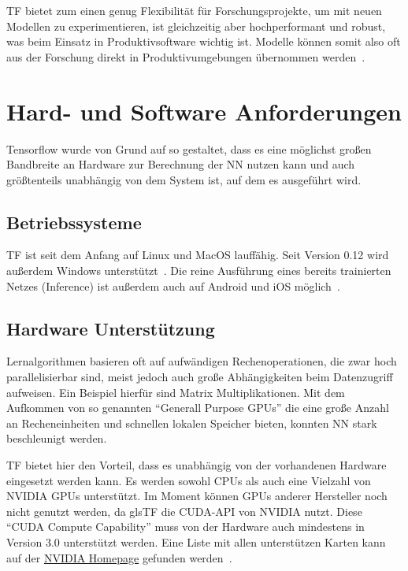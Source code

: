 \gls{TF} bietet zum einen genug Flexibilität für Forschungsprojekte, um mit neuen Modellen zu experimentieren, ist gleichzeitig aber hochperformant und robust, was beim Einsatz in Produktivsoftware wichtig ist. Modelle können somit also oft aus der Forschung direkt in Produktivumgebungen übernommen werden~\cite{tensorflow2016-whitepaper}.


\section{Hard- und Software Anforderungen}
Tensorflow wurde von Grund auf so gestaltet, dass es eine möglichst großen Bandbreite an Hardware zur Berechnung der \gls{NN} nutzen kann und auch größtenteils unabhängig von dem System ist, auf dem es ausgeführt wird.

\subsection{Betriebssysteme}
\gls{TF} ist seit dem Anfang auf Linux und MacOS lauffähig. Seit Version 0.12 wird außerdem Windows unterstützt~\cite{tf0.12}. Die reine Ausführung eines bereits trainierten Netzes (Inference) ist außerdem auch auf Android und iOS möglich~\cite{tensorflow2015-whitepaper}\cite{tensorflow2016-whitepaper}.

\subsection{Hardware Unterstützung}
Lernalgorithmen basieren oft auf aufwändigen Rechenoperationen, die zwar hoch parallelisierbar sind, meist jedoch auch große Abhängigkeiten beim Datenzugriff aufweisen. Ein Beispiel hierfür sind Matrix Multiplikationen. Mit dem Aufkommen von so genannten "`Generall Purpose GPUs"' die eine große Anzahl an Recheneinheiten und schnellen lokalen Speicher bieten, konnten \gls{NN} stark beschleunigt werden.

\gls{TF} bietet hier den Vorteil, dass es unabhängig von der vorhandenen Hardware eingesetzt werden kann. Es werden sowohl CPUs als auch eine Vielzahl von NVIDIA GPUs unterstützt. Im Moment können GPUs anderer Hersteller noch nicht genutzt werden, da gls{TF} die CUDA-API von NVIDIA nutzt. Diese "`CUDA Compute Capability"' muss von der Hardware auch mindestens in Version 3.0 unterstützt werden. Eine Liste mit allen unterstützen Karten kann auf der \href{https://developer.nvidia.com/cuda-gpus}{NVIDIA Homepage} gefunden werden~\cite{tfinstall}.

